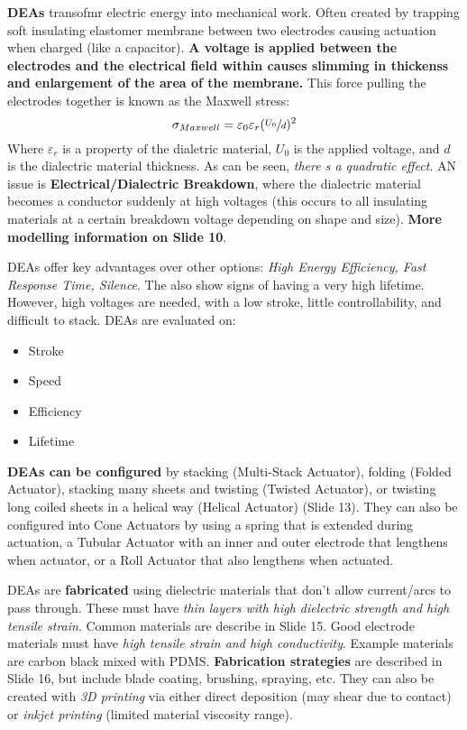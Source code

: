 \documentclass[onecolumn,a4paper]{article}
\begin{document}
\textbf{DEAs} transofmr electric energy into mechanical work. Often created by trapping soft insulating elastomer membrane between two electrodes causing actuation when charged (like a capacitor). \textbf{A voltage is applied between the electrodes and the electrical field within causes slimming in thickenss and enlargement of the area of the membrane.} This force pulling the electrodes together is known as the Maxwell stress:
\begin{equation}
    \sigma_{Maxwell}=\varepsilon_0 \varepsilon_r (\sfrac{U_0}{d})^2
\end{equation}
Where $\varepsilon_r$ is a property of the dialetric material, $U_0$ is the applied voltage, and $d$ is the dialectric material thickness. As can be seen, \emph{there s a quadratic effect}. AN issue is \textbf{Electrical/Dialectric Breakdown}, where the dialectric material becomes a conductor suddenly at high voltages (this occurs to all insulating materials at a certain breakdown voltage depending on shape and size). \textbf{More modelling information on Slide 10}.

DEAs  offer key advantages over other options: \emph{High Energy Efficiency, Fast Response Time, Silence}. The also show signs of having a very high lifetime. However, high voltages are needed, with a low stroke, little controllability, and difficult to stack. DEAs are evaluated on:
\begin{itemize}
    \item Stroke
    \item Speed
    \item Efficiency
    \item Lifetime
\end{itemize}

\textbf{DEAs can be configured} by stacking (Multi-Stack Actuator), folding (Folded Actuator), stacking many sheets and twisting (Twisted Actuator), or twisting long coiled sheets in a helical way (Helical Actuator) (Slide 13). They can also be configured into Cone Actuators by using a spring that is extended during actuation, a Tubular Actuator with an inner and outer electrode that lengthens when actuator, or a Roll Actuator that also lengthens when actuated.

DEAs are \textbf{fabricated} using dielectric materials that don't allow current/arcs to pass through. These must have \emph{thin layers with high dielectric strength and high tensile strain}. Common materials are describe in Slide 15. Good electrode materials must have \emph{high tensile strain and high conductivity}. Example materials are carbon black mixed with PDMS. \textbf{Fabrication strategies} are described in Slide 16, but include blade coating, brushing, spraying, etc. They can also be created with \emph{3D printing} via either direct deposition (may shear due to contact) or \emph{inkjet printing} (limited material viscosity range).
\end{document}
